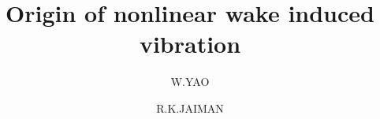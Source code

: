 \usepackage{environ}

\usepackage{xcolor}
\usepackage{tikz}

\newcommand{\reddashdot}{\raisebox{2pt}{\tikz{\draw[red,dashdotted,line width=1.2pt](0,0) -- (5mm,0);}}}
\newcommand{\bluedashdot}{\raisebox{2pt}{\tikz{\draw[blue,dashdotted,line width=1.2pt](0,0) -- (5mm,0);}}}
\newcommand{\greendashdot}{\raisebox{2pt}{\tikz{\draw[green,dashdotted,line width=1.2pt](0,0) -- (5mm,0);}}}
\newcommand{\greendash}{\raisebox{2pt}{\tikz{\draw[green,dashed,line width=1.2pt](0,0) -- (5mm,0);}}}
\newcommand{\greensolid}{\raisebox{2pt}{\tikz{\draw[green,solid,line width=1.2pt](0,0) -- (5mm,0);}}}
\newcommand{\reddash}{\raisebox{2pt}{\tikz{\draw[red,dashed,line width=1.2pt](0,0) -- (5mm,0);}}}
\newcommand{\reddot}{\raisebox{2pt}{\tikz{\draw[red,dotted,line width=1.2pt](0,0) -- (5mm,0);}}}
\newcommand{\bluedash}{\raisebox{2pt}{\tikz{\draw[blue,dashed,line width=1.2pt](0,0) -- (5mm,0);}}}
\newcommand{\blackdash}{\raisebox{2pt}{\tikz{\draw[black,dashed,line width=1.2pt](0,0) -- (5mm,0);}}}
%
%
%
%
%


\title{Origin of nonlinear wake induced vibration %
}


\author{W.YAO         \and
        R.K.JAIMAN %
}



